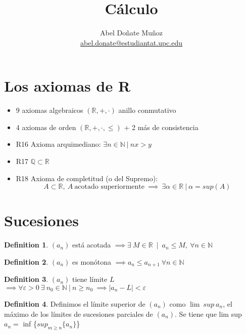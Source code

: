 \documentclass[12pt]{article}
\title{Cálculo}
\author{Abel Doñate Muñoz \\
\small{\href{mailto:abel.donate@estudiantat.upc.edu}{abel.donate@estudiantat.upc.edu}}}
\date{}
\theoremstyle{plain}
\theoremstyle{definition}
\newtheorem{defn}{Definition}[section]
\theoremstyle{remark}
\begin{document}
\maketitle
\tableofcontents
\newpage

\section{Los axiomas de R}
\begin{itemize}
  \item 9 axiomas algebraicos $(\mathbb{R},+,\cdot)$ anillo conmutativo
  \item 4 axiomas de orden $(\mathbb{R},+,\cdot, \leq)$ + 2 más de consistencia
  \item R16 Axioma arquimediano: $\exists n \in \mathbb{N}\ |\ nx>y$
  \item R17 $\mathbb{Q} \subset \mathbb{R}$
  \item R18 Axioma de completitud (o del Supremo): \\
  \[A \subset \mathbb{R}, \ A \ \text{acotado superiormente} \ \implies \ \exists \alpha \in 			  \mathbb{R} \ | \ \alpha = sup(A)\]
\end{itemize}

\section{Sucesiones}
\begin{defn}
	$(a_n)$ está acotada $\implies \exists \ M \in \mathbb{R}\ \mid \  a_n \leq M,\  \forall n \in \mathbb{N}$
\end{defn}
\begin{defn}
	$(a_n)$ es monótona $\implies a_n\leq a_{n+1}\ \forall n\in \mathbb{N}$
\end{defn}
\begin{defn}
	$(a_n)$ tiene límite $L$ $\implies \forall \varepsilon >0 \ \exists \ n_0\in \mathbb{N} \ | \ n\geq n_0 \ \implies |a_n-L|<\varepsilon$
\end{defn}
\begin{defn}
	Definimos el límite superior de $(a_n)$ como $\lim\ sup\ a_n$, el máximo de los límites de sucesiones parciales de $(a_n)$. Se tiene que lim sup $a_n=$ inf \{$sup_{m\geq n}{\{a_n\}}$\}
\end{defn}
\end{document}
